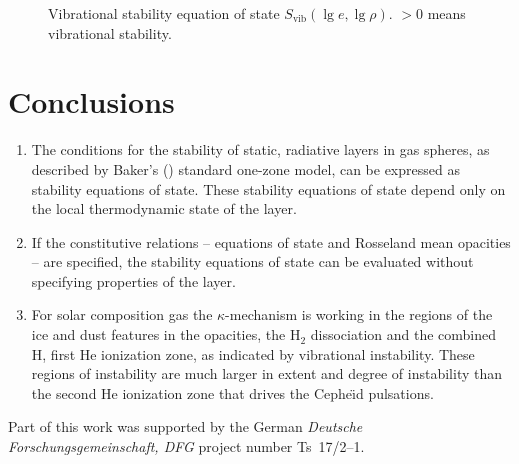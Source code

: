 \documentclass{aa}
\begin{document}
%
   \begin{figure}
   \centering
      \caption{Vibrational stability equation of state
               $S_{\mathrm{vib}}(\lg e, \lg \rho)$.
               $>0$ means vibrational stability.
              }
         \label{FigVibStab}
   \end{figure}

\section{Conclusions}

   \begin{enumerate}
      \item The conditions for the stability of static, radiative
         layers in gas spheres, as described by Baker's (\citeyear{baker})
         standard one-zone model, can be expressed as stability
         equations of state. These stability equations of state depend
         only on the local thermodynamic state of the layer.
      \item If the constitutive relations -- equations of state and
         Rosseland mean opacities -- are specified, the stability
         equations of state can be evaluated without specifying
         properties of the layer.
      \item For solar composition gas the $\kappa$-mechanism is
         working in the regions of the ice and dust features
         in the opacities, the $\mathrm{H}_2$ dissociation and the
         combined H, first He ionization zone, as
         indicated by vibrational instability. These regions
         of instability are much larger in extent and degree of
         instability than the second He ionization zone
         that drives the Cephe{\"\i}d pulsations.
   \end{enumerate}

\begin{acknowledgements}
      Part of this work was supported by the German
      \emph{Deut\-sche For\-schungs\-ge\-mein\-schaft, DFG\/} project
      number Ts~17/2--1.
\end{acknowledgements}

%
%


\end{document}
